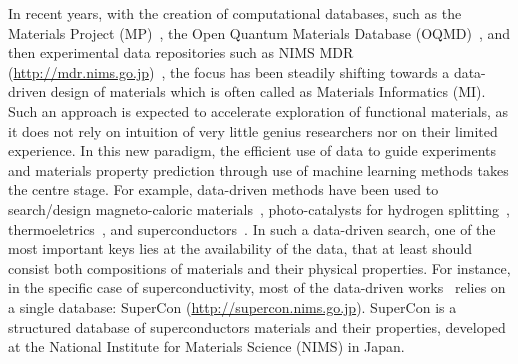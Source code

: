 \documentclass{article}
\begin{document}

In recent years, with the creation of computational databases, such as the Materials Project (MP)~\cite{materialsprojectJain2013}, the Open Quantum Materials Database (OQMD)~\cite{oqmdkirklin2015open}, and then experimental data repositories such as NIMS MDR (\url{http://mdr.nims.go.jp})~\cite{ranganathan_anusha_2019_3553963}, the focus has been steadily shifting towards a data-driven design of materials which is often called as Materials Informatics (MI). 
Such an approach is expected to accelerate exploration of functional materials, as it does not rely on intuition of very little genius researchers nor on their limited experience.
In this new paradigm, the efficient use of data to guide experiments and materials property prediction through use of machine learning methods takes the centre stage. 
For example, data-driven methods have been used to search/design magneto-caloric materials~\cite{Bocarsly2017,Castro2020,court2021inverse}, photo-catalysts for hydrogen splitting~\cite{xiong2021optimizing}, thermoeletrics~\cite{iwasaki2019machine}, and superconductors~\cite{stanev_machine_2017}. 
In such a data-driven search, one of the most important keys lies at the availability of the data, that at least should consist both compositions of materials and their physical properties. 
For instance, in the specific case of superconductivity, most of the data-driven works~\cite{stanev_machine_2017, le2020critical,Hamlin2019SuperconductivityNR} relies on a single database: SuperCon (\url{http://supercon.nims.go.jp}). SuperCon is a structured database of superconductors materials and their properties, developed at the National Institute for Materials Science (NIMS) in Japan. 

\end{document}
